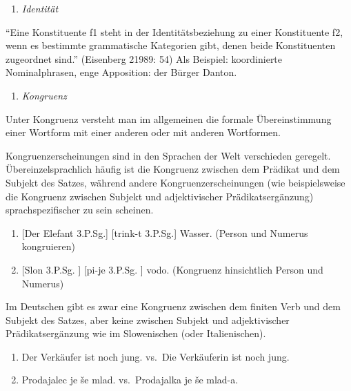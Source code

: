 \documentclass[
]{article}
\providecommand{\tightlist}{%
  \setlength{\itemsep}{0pt}\setlength{\parskip}{0pt}}
\begin{document}
\begin{enumerate}
\def\labelenumi{\arabic{enumi}.}
\setcounter{enumi}{1}
\tightlist
\item
  \emph{Identität}
\end{enumerate}

``Eine Konstituente f1 steht in der Identitätsbeziehung zu einer Konstituente f2, wenn es bestimmte grammatische Kategorien gibt, denen beide Konstituenten zugeordnet sind.'' (Eisenberg 21989: 54) Als Beispiel: koordinierte Nominalphrasen, enge Apposition: der Bürger Danton.

\begin{enumerate}
\def\labelenumi{\arabic{enumi}.}
\setcounter{enumi}{2}
\tightlist
\item
  \emph{Kongruenz}
\end{enumerate}

Unter Kongruenz versteht man im allgemeinen die formale Übereinstimmung einer Wortform mit einer anderen oder mit anderen Wortformen.

Kongruenzerscheinungen sind in den Sprachen der Welt verschieden geregelt. Übereinzelsprachlich häufig ist die Kongruenz zwischen dem Prädikat und dem Subjekt des Satzes, während andere Kongruenzerscheinungen (wie beispielsweise die Kongruenz zwischen Subjekt und adjektivischer Prädikatsergänzung) sprachspezifischer zu sein scheinen.

\begin{enumerate}
\def\labelenumi{(\arabic{enumi})}
\setcounter{enumi}{3}
\tightlist
\item
  {[}Der Elefant 3.P.Sg.{]} {[}trink-t 3.P.Sg.{]} Wasser. (Person und Numerus kongruieren)
\item
  {[}Slon 3.P.Sg. {]} {[}pi-je 3.P.Sg. {]} vodo. (Kongruenz hinsichtlich Person und Numerus)
\end{enumerate}

Im Deutschen gibt es zwar eine Kongruenz zwischen dem finiten Verb und dem Subjekt des Satzes, aber keine zwischen Subjekt und adjektivischer Prädikatsergänzung wie im Slowenischen (oder Italienischen).

\begin{enumerate}
\def\labelenumi{(\arabic{enumi})}
\setcounter{enumi}{5}
\tightlist
\item
  Der Verkäufer ist noch jung. vs.~Die Verkäuferin ist noch jung.
\item
  Prodajalec je še mlad. vs.~Prodajalka je še mlad-a.
\end{enumerate}
\end{document}
